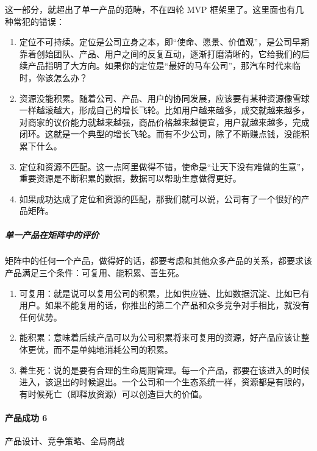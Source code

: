 \documentclass[letterpaper,10pt,english]{sphinxmanual}
\begin{document}
这一部分，就超出了单一产品的范畴，不在四轮 MVP
框架里了。这里面也有几种常犯的错误：
\begin{enumerate}
%
\item {} 
定位不可持续。定位是公司立身之本，即“使命、愿景、价值观”，是公司早期靠着创始团队、产品、用户之间的反复互动，逐渐打磨清晰的，它给我们的后续产品指明了大方向。如果你的定位是“最好的马车公司”，那汽车时代来临时，你该怎么办？

\item {} 
资源没能积累。随着公司、产品、用户的协同发展，应该要有某种资源像雪球一样越滚越大，形成自己的增长飞轮。比如用户越来越多，成交就越来越多，对商家的议价能力就越来越强，商品价格越来越便宜，用户就越来越多，完成闭环。这就是一个典型的增长飞轮。而有不少公司，除了不断赚点钱，没能积累下什么。

\item {} 
定位和资源不匹配。这一点阿里做得不错，使命是“让天下没有难做的生意”，重要资源是不断积累的数据，数据可以帮助生意做得更好。

\item {} 
如果成功达成了定位和资源的匹配，那我们就可以说，公司有了一个很好的产品矩阵。

\end{enumerate}


\subparagraph{单一产品在矩阵中的评价}
\label{\detokenize{chapter_introduction/Product:id41}}
矩阵中的任何一个产品，做得好的话，都要考虑和其他众多产品的关系，都要求该产品满足三个条件：可复用、能积累、善生死。
\begin{enumerate}
%
\item {} 
可复用：就是说可以复用公司的积累，比如供应链、比如数据沉淀、比如已有用户。如果不能复用的话，你推出的第二个产品和众多竞争对手相比，就没有任何优势。

\item {} 
能积累：意味着后续产品可以为公司积累将来可复用的资源，好产品应该让整体更优，而不是单纯地消耗公司的积累。

\item {} 
善生死：说的是要有合理的生命周期管理。每一个产品，都要在该进入的时候进入，该退出的时候退出。一个公司和一个生态系统一样，资源都是有限的，有时候死亡（即释放资源）可以创造巨大的价值。

\end{enumerate}


\paragraph{产品成功 6\sphinxfootnotemark[50]}
\label{\detokenize{chapter_introduction/Product:id42}}%
\begin{footnotetext}[50]\sphinxAtStartFootnote
{}
%
\end{footnotetext}\ignorespaces 
产品设计、竞争策略、全局商战
\end{document}
